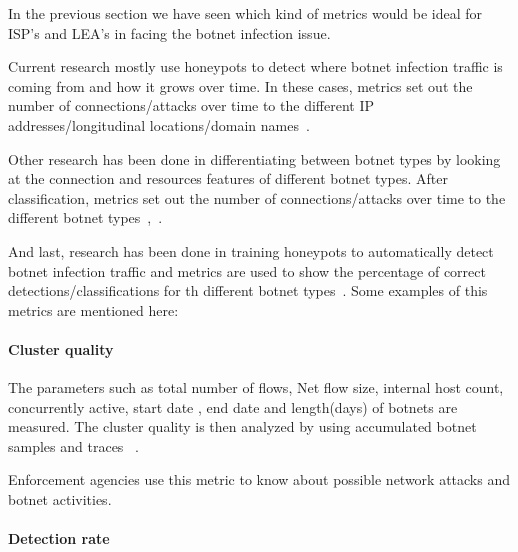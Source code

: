 

In the previous section we have seen which kind of metrics would be ideal for ISP's and LEA's in facing the botnet infection issue.

Current research mostly use honeypots to detect where botnet infection traffic is coming from and how it grows over time. In these cases, metrics set out the number of connections/attacks over time to the different IP addresses/longitudinal locations/domain names~\cite{AM2006}.

Other research has been done in differentiating between botnet types by looking at the connection and resources features of different botnet types. After classification, metrics set out the number of connections/attacks over time to the different botnet types~\cite{GJ2007},~\cite{AM2005}.

And last, research has been done in training honeypots to automatically detect botnet infection traffic and metrics are used to show the percentage of correct detections/classifications for th different botnet types~\cite{haltas2014automated}.
Some examples of this metrics are mentioned here:
\paragraph{Cluster quality }

The  parameters such as total number of flows, Net flow size, internal host count, concurrently  active, start date , end date and length(days) of botnets are measured. The cluster quality is then analyzed by using accumulated botnet samples and traces ~\cite{haltas2014automated}.

Enforcement agencies use this metric to know about possible network attacks and botnet activities.


\paragraph{ Detection rate }

